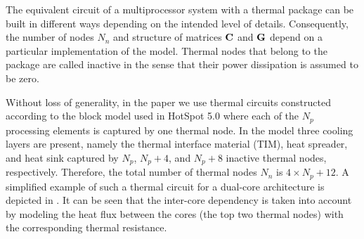 The equivalent circuit of a multiprocessor system with a thermal package can be built in different ways depending on the intended level of details. Consequently, the number of nodes $N_n$ and structure of matrices $\mathbf{C}$ and $\mathbf{G}$ depend on a particular implementation of the model. Thermal nodes that belong to the package are called inactive in the sense that their power dissipation is assumed to be zero.

Without loss of generality, in the paper we use thermal circuits constructed according to the block model used in HotSpot 5.0 \cite{huang2008} where each of the $N_p$ processing elements is captured by one thermal node. In the model three cooling layers are present, namely the thermal interface material (TIM), heat spreader, and heat sink captured by $N_p$, $N_p + 4$, and $N_p + 8$ inactive thermal nodes, respectively. Therefore, the total number of thermal nodes $N_n$ is $4 \times N_p + 12$. A simplified example of such a thermal circuit for a dual-core architecture is depicted in . It can be seen that the inter-core dependency is taken into account by modeling the heat flux between the cores (the top two thermal nodes) with the corresponding thermal resistance.

